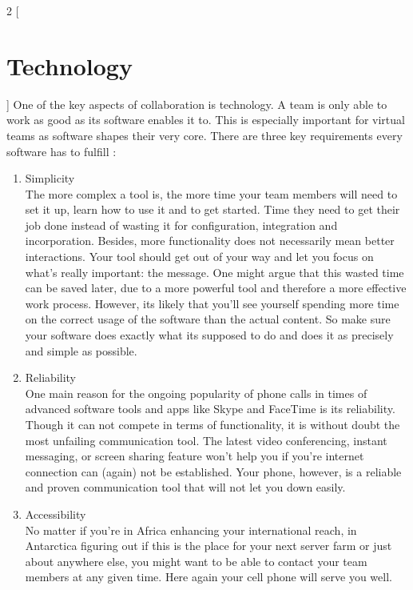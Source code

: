 
\begin{multicols}{2}
[\section{Technology}]
One of the key aspects of collaboration is technology. A team is only able to work as good as its software enables it to. This is especially important for virtual teams as software shapes their very core.
There are three key requirements every software has to fulfill \cite{HBR}:

\begin{enumerate}[1.]

	\item Simplicity\\
The more complex a tool is, the more time your team members will need to set it up, learn how to use it and to get started. Time they need to get their job done instead of wasting it  for configuration, integration and incorporation. Besides, more functionality does not necessarily mean better interactions. Your tool should get out of your way and let you focus on what’s really important: the message. One might argue that this wasted time can be saved later, due to a more powerful tool and therefore a more effective work process. However, its likely that you’ll see yourself spending more time on the correct usage of the software than the actual content. So make sure your software does exactly what its supposed to do and does it as precisely and simple as possible.

	\item Reliability\\
One main reason for the ongoing popularity of phone calls in times of advanced software tools and apps like Skype and FaceTime is its reliability. Though it can not compete in terms of functionality, it is without doubt the most unfailing communication tool. The latest video conferencing, instant messaging, or screen sharing feature won’t help you if you’re internet connection can (again) not be established.
Your phone, however, is a reliable and proven communication tool that will not let you down easily.

	\item Accessibility\\
No matter if you’re in Africa enhancing your international reach, in Antarctica figuring out if this is the place for your next server farm or just about anywhere else, you might want to be able to contact your team members at any given time.  Here again your cell phone will serve you well.
\end{enumerate}
\end{multicols}